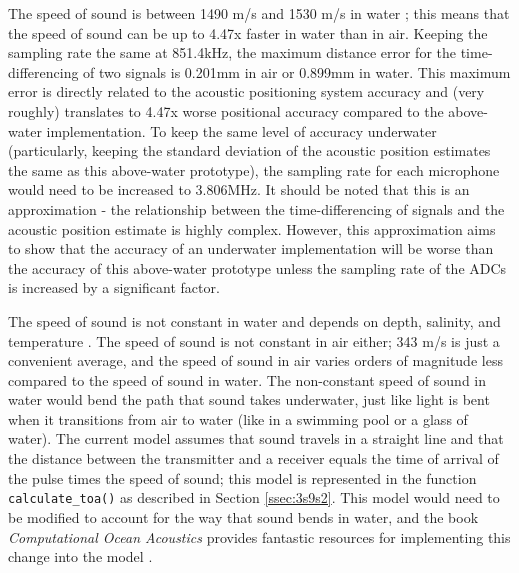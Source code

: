 \documentclass[12pt,a4paper]{report}
\begin{document}
The speed of sound is between 1490 m/s and 1530 m/s in water \cite{computational}; this means that the speed of sound can be up to 4.47x faster in water than in air. Keeping the sampling rate the same at 851.4kHz, the maximum distance error for the time-differencing of two signals is 0.201mm in air or 0.899mm in water. This maximum error is directly related to the acoustic positioning system accuracy and (very roughly) translates to 4.47x worse positional accuracy compared to the above-water implementation. To keep the same level of accuracy underwater (particularly, keeping the standard deviation of the acoustic position estimates the same as this above-water prototype), the sampling rate for each microphone would need to be increased to 3.806MHz. It should be noted that this is an approximation - the relationship between the time-differencing of signals and the acoustic position estimate is highly complex. However, this approximation aims to show that the accuracy of an underwater implementation will be worse than the accuracy of this above-water prototype unless the sampling rate of the ADCs is increased by a significant factor.

The speed of sound is not constant in water and depends on depth, salinity, and temperature \cite{computational}. The speed of sound is not constant in air either; 343 m/s is just a convenient average, and the speed of sound in air varies orders of magnitude less compared to the speed of sound in water. The non-constant speed of sound in water would bend the path that sound takes underwater, just like light is bent when it transitions from air to water (like in a swimming pool or a glass of water). The current model assumes that sound travels in a straight line and that the distance between the transmitter and a receiver equals the time of arrival of the pulse times the speed of sound; this model is represented in the function \verb|calculate_toa()| as described in Section \ref{ssec:3s9s2}. This model would need to be modified to account for the way that sound bends in water, and the book \textit{Computational Ocean Acoustics} provides fantastic resources for implementing this change into the model \cite{computational}.
\end{document}
